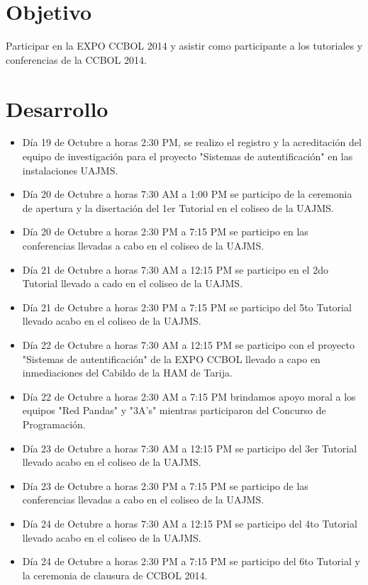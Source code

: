 \documentclass[letterpaper,12pt]{article}
\begin{document}
	\section{Objetivo}
	
	Participar en la EXPO CCBOL 2014 y asistir como participante a los tutoriales y conferencias de la CCBOL 2014.
	
	\section{Desarrollo}
	
	\begin{itemize}
		\item D\'ia 19 de Octubre a horas 2:30 PM, se realizo el registro y la acreditaci\'on del equipo de investigaci\'on para el proyecto "Sistemas de autentificaci\'on" en las instalaciones UAJMS.
		
		\item D\'ia 20 de Octubre a horas 7:30 AM a 1:00 PM se participo de la ceremonia de apertura y la disertaci\'on del 1er Tutorial en el coliseo de la UAJMS.
		
		\item D\'ia 20 de Octubre a horas 2:30 PM a 7:15 PM se participo en las conferencias llevadas a cabo en el coliseo de la UAJMS.
		
		\item D\'ia	21 de Octubre a horas 7:30 AM a 12:15 PM se participo en el 2do Tutorial llevado a cado en el coliseo de la UAJMS.
		
		\item D\'ia 21 de Octubre a horas 2:30 PM a 7:15 PM se participo del 5to Tutorial llevado acabo en el coliseo de la UAJMS.
		
		\item D\'ia 22 de Octubre a horas 7:30 AM a 12:15 PM se participo con el proyecto "Sistemas de autentificaci\'on" de la EXPO CCBOL llevado a capo en inmediaciones  del Cabildo de la HAM de Tarija.
		
		\item D\'ia 22 de Octubre a horas 2:30 AM a 7:15 PM brindamos apoyo moral a los equipos "Red Pandas" y "3A's" mientras participaron del Concurso de Programaci\'on.  
		
		\item D\'ia 23 de Octubre a horas 7:30 AM a 12:15 PM se participo del 3er Tutorial llevado acabo en el coliseo de la UAJMS.
		
		\item D\'ia 23 de Octubre a horas 2:30 PM a 7:15 PM se participo de las conferencias llevadas a cabo en el coliseo de la UAJMS.
		
		\item D\'ia 24 de Octubre a horas 7:30 AM a 12:15 PM se participo del 4to Tutorial llevado acabo en el coliseo de la UAJMS.
		
		\item D\'ia 24 de Octubre a horas 2:30 PM a 7:15 PM se participo del 6to Tutorial y la ceremonia de clausura de CCBOL 2014.   

		\end{itemize}
		
\end{document}
